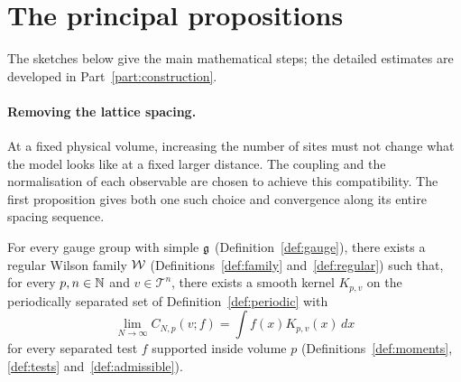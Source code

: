 \section{The principal propositions}\label{subsec:principal}

The sketches below give the main mathematical steps; the detailed estimates are developed in Part~\ref{part:construction}.

\paragraph{Removing the lattice spacing.}
At a fixed physical volume, increasing the number of sites must not change what the model looks like at a fixed larger distance.
The coupling and the normalisation of each observable are chosen to achieve this compatibility.
The first proposition gives both one such choice and convergence along its entire spacing sequence.

\begin{proposition}\label{prop:uv}
For every gauge group with simple $\mathfrak g$ (Definition~\ref{def:gauge}), there exists a regular Wilson family $\mathcal W$ (Definitions~\ref{def:family} and~\ref{def:regular}) such that, for every $p,n\in\mathbb N$ and $v\in\mathcal T^n$, there exists a smooth kernel $K_{p,v}$ on the periodically separated set of Definition~\ref{def:periodic} with
\begin{equation}\label{eq:fixed-volume}
\lim_{N\to\infty}C_{N,p}(v;f)=\int f(x)K_{p,v}(x)\,dx
\end{equation}
for every separated test $f$ supported inside volume $p$ (Definitions~\ref{def:moments}, \ref{def:tests} and~\ref{def:admissible}).
\end{proposition}

